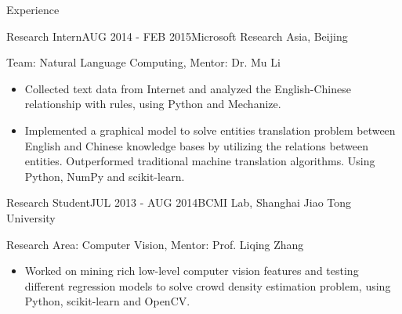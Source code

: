 \documentclass{resume} %
\begin{document}
\begin{rSection}{Experience}
\begin{rSubsection}{Research Intern}{AUG 2014 - FEB 2015}{Microsoft Research Asia, Beijing}

Team: Natural Language Computing, Mentor: Dr. Mu Li
\begin{itemize}
\item Collected text data from Internet and analyzed the English-Chinese relationship with rules, using Python and Mechanize.
\item Implemented a graphical model to solve entities translation problem between English and Chinese knowledge bases by utilizing the relations between entities. Outperformed traditional machine translation algorithms. Using Python, NumPy and scikit-learn.
\end{itemize}
\end{rSubsection}
\vspace{5pt}
\begin{rSubsection}{Research Student}{JUL 2013 - AUG 2014}{BCMI Lab, Shanghai Jiao Tong University}

Research Area: Computer Vision, Mentor: Prof. Liqing Zhang
\begin{itemize}
\item Worked on mining rich low-level computer vision features and testing different regression models to solve crowd density estimation problem, using Python, scikit-learn and OpenCV.
\end{itemize}
\end{rSubsection}
\end{rSection}
\end{document}
